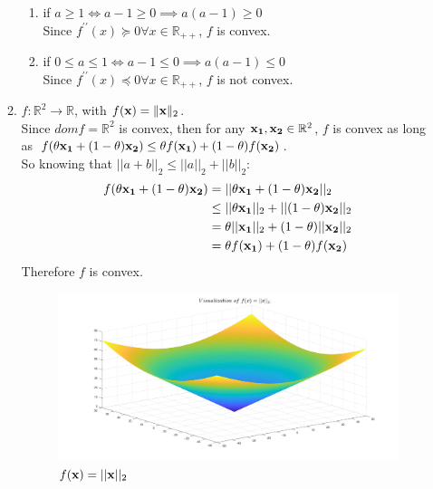 \documentclass[12pt]{article}
\begin{document}
\begin{enumerate}
\begin{enumerate}
\begin{enumerate}
 \item if $a \ge 1 \iff a-1\ge0 \implies a(a-1)\ge0$\\
 Since $f^{\prime\prime}(x)\succcurlyeq0 \forall x\in\mathbb{R}_{++}$, $f$ is convex.
 
 \item if $0\leq a \leq 1 \iff a-1\leq0 \implies a(a-1)\leq0$\\
 Since $f^{\prime\prime}(x)\preccurlyeq0 \forall x\in\mathbb{R}_{++}$, $f$ is not convex.
\end{enumerate}

\item 
$f:\mathbb{R}^2 \rightarrow \mathbb{R}$, with $f({\bf x}) = \|{\bf x}\|_2$.\\
Since $domf=\mathbb{R}^2$ is convex, then for any ${\bf x_1},{\bf x_2}\in \mathbb{R}^2$, $f$ is convex as long as $f(\theta{\bf x_1}+(1-\theta){\bf x_2})\leq \theta f({\bf x_1})+(1-\theta)f({\bf x_2})$.\\
So knowing that $||a+b||_2\leq ||a||_2+||b||_2$:\\
\begin{equation}
	\begin{split}
		f(\theta{\bf x_1}+(1-\theta){\bf x_2}) &= ||\theta{\bf x_1}+(1-\theta){\bf x_2}||_2\\
		&\leq ||\theta{\bf x_1}||_2 + ||(1-\theta){\bf x_2}||_2\\
		&= \theta ||{\bf x_1}||_2 + (1-\theta)||{\bf x_2}||_2\\
		&= \theta f({\bf x_1}) + (1-\theta)f({\bf x_2})
	\end{split}
\end{equation}
Therefore $f$ is convex.
\begin{figure}[h!]
	\centering
	\includegraphics[width=\textwidth]{9.png}
	\caption{$f({\bf x})=||{\bf x}||_2$}
	\label{fig:9}
\end{figure}\\

\end{enumerate}
\end{enumerate}
\end{document}
